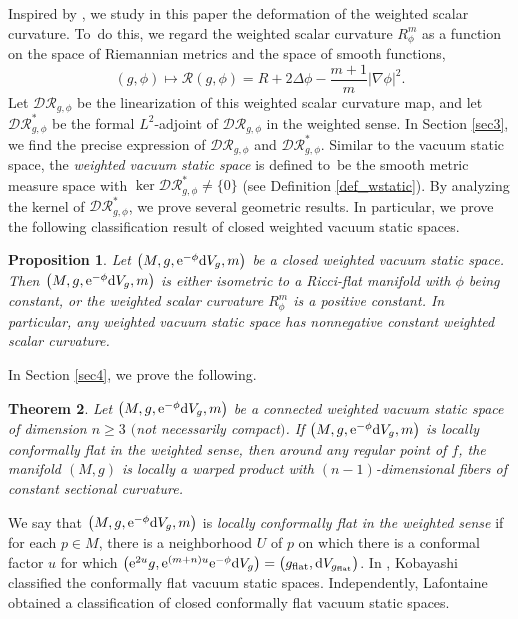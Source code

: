 \documentclass[pdftex]{sigma}
\numberwithin{equation}{section}
\newtheorem{Theorem}{Theorem}[section]
\newtheorem{Proposition}[Theorem]{Proposition}
 { \theoremstyle{definition}
\newtheorem{Definition}[Theorem]{Definition}
\newtheorem{Note}[Theorem]{Note}
\newtheorem{Example}[Theorem]{Example}
\newtheorem{Remark}[Theorem]{Remark} }
\begin{document}
Inspired by \cite{Fischer&Marsden}, we study in this paper the deformation of the weighted scalar curvature.
To~do this, we regard the weighted scalar curvature $R_\phi^m$ as a
function on the space of Riemannian metrics and the space of smooth functions,
\begin{equation*}
 (g,\phi)\mapsto \mathcal{R}(g,\phi)=R+2\Delta \phi -\frac{m+1}{m}|\nabla \phi|^2.
\end{equation*}
Let $\mathcal{DR}_{g,\phi}$ be the linearization of this weighted scalar curvature map, and let $\mathcal{DR}_{g,\phi}^*$ be the formal $L^2$-adjoint of $\mathcal{DR}_{g,\phi}$ in the weighted sense.
In Section \ref{sec3}, we find the precise expression of $\mathcal{DR}_{g,\phi}$ and $\mathcal{DR}^*_{g,\phi}$.
Similar to the vacuum static space, the \textit{weighted vacuum static space}
is defined to~be the smooth metric measure space with $\ker \mathcal{DR}_{g,\phi}^*\neq \{0\}$ (see Definition \ref{def_wstatic}).
By analyzing the kernel of $\mathcal{DR}_{g,\phi}^*$, we prove several geometric results.
In particular, we prove the following classification result of closed weighted vacuum static spaces.

\begin{Proposition}\label{propRneg}
 Let $\bigl(M,g,{\rm e}^{-\phi}{\rm d}V_g,m\bigr)$ be a closed weighted vacuum static space. Then $\bigl(M,g,\allowbreak {\rm e}^{-\phi}{\rm d}V_g,m\bigr)$ is either isometric to a Ricci-flat manifold with $\phi$
 being constant, or the weighted scalar curvature $R_\phi^m$ is a positive constant.
 In particular, any weighted vacuum static space has nonnegative constant weighted scalar curvature.
\end{Proposition}

In Section \ref{sec4}, we prove the following.

\begin{Theorem}\label{thm1.1}
 Let $\bigl(M,g,{\rm e}^{-\phi}{\rm d}V_g,m\bigr)$ be a connected weighted vacuum static space of dimension $n\geq3$ $($not necessarily compact$)$. If $\bigl(M,g,{\rm e}^{-\phi}{\rm d}V_g,m\bigr)$ is locally conformally flat in the weighted sense, then around any regular point of $f$, the manifold $(M,g)$ is locally a warped product with $(n-1)$-dimensional fibers of constant sectional curvature.
 \end{Theorem}
We say that $\bigl(M,g,{\rm e}^{-\phi}{\rm d}V_g,m\bigr)$ is \textit{locally conformally flat in the weighted sense} if for each $p\in M$, there is a neighborhood $U$ of $p$ on which there is a conformal factor $u$ for which $\bigl({\rm e}^{2u}g,{\rm e}^{(m+n)u}{\rm e}^{-\phi}{\rm d}V_g\bigr)=\bigl(g_{\rm flat},{\rm d}V_{g_{\rm flat}}\bigr)$. In \cite{Kobayashi}, Kobayashi classified the conformally flat vacuum static spaces. Independently, Lafontaine \cite{Lafontaine} obtained a classification of closed conformally flat vacuum static spaces.
\end{document}
